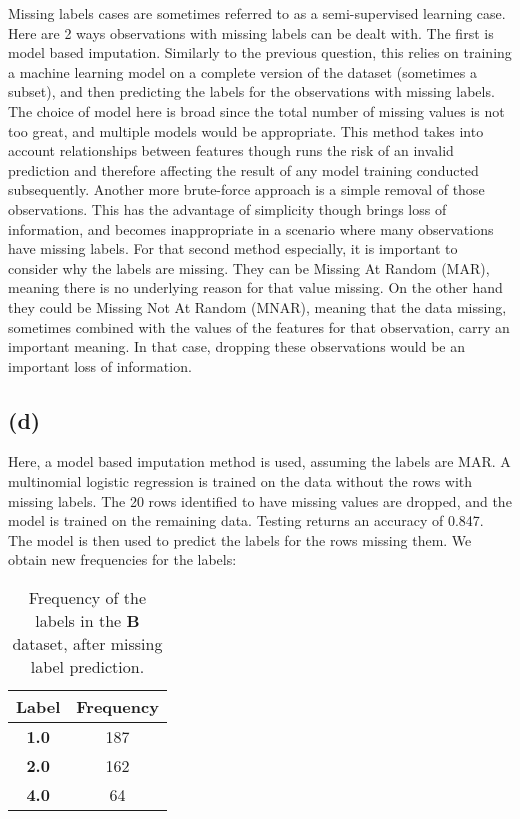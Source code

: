 \documentclass[12pt]{report} %
\begin{document}
Missing labels cases are sometimes referred to as a semi-supervised learning case\cite[p. 24]{james2013introduction}. Here are 2 ways observations with missing labels can be dealt with. The first is model based imputation. Similarly to the previous question, this relies on training a machine learning model on a complete version of the dataset (sometimes a subset), and then predicting the labels for the observations with missing labels. The choice of model here is broad since the total number of missing values is not too great, and multiple models would be appropriate. This method takes into account relationships between features though runs the risk of an invalid prediction and therefore affecting the result of any model training conducted subsequently. Another more brute-force approach is a simple removal of those observations. This has the advantage of simplicity though brings loss of information, and becomes inappropriate in a scenario where many observations have missing labels. For that second method especially, it is important to consider why the labels are missing. They can be Missing At Random (MAR), meaning there is no underlying reason for that value missing. On the other hand they could be Missing Not At Random (MNAR), meaning that the data missing, sometimes combined with the values of the features for that observation, carry an important meaning. In that case, dropping these observations would be an important loss of information\cite[pp. 515-516]{james2013introduction}.

\subsection*{(d)}

Here, a model based imputation method is used, assuming the labels are MAR. A multinomial logistic regression is trained on the data without the rows with missing labels. The 20 rows identified to have missing values are dropped, and the model is trained on the remaining data. Testing returns an accuracy of 0.847. The model is then used to predict the labels for the rows missing them. We obtain new frequencies for the labels: 

\begin{table}[h]
    \centering
    \begin{tabular}{ |c|c| }
        \hline
        \textbf{Label} & \textbf{Frequency} \\
        \hline
        \textbf{1.0} & 187 \\ 
        \hline
        \textbf{2.0} & 162 \\
        \hline
        \textbf{4.0} & 64 \\
        \hline
    \end{tabular}
    \caption{Frequency of the labels in the \textbf{B} dataset, after missing label prediction.}
    \end{table}
\end{document}
